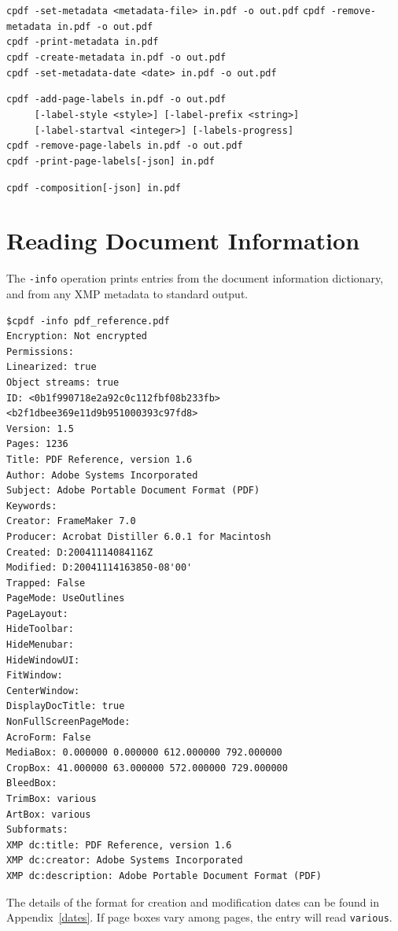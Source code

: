 \documentclass{book}
\begin{document}
\begin{framed}
    \vspace{1.5mm}
    \small\noindent\verb!cpdf -set-metadata <metadata-file> in.pdf -o out.pdf!
    \small\noindent\verb!cpdf -remove-metadata in.pdf -o out.pdf!\\
    \small\noindent\verb!cpdf -print-metadata in.pdf!\\
    \small\noindent\verb!cpdf -create-metadata in.pdf -o out.pdf!\\
    \small\noindent\verb!cpdf -set-metadata-date <date> in.pdf -o out.pdf!
    
    \vspace{1.5mm}
    \small\noindent\verb!cpdf -add-page-labels in.pdf -o out.pdf!\\
    \noindent\verb!     [-label-style <style>] [-label-prefix <string>]!\\
    \noindent\verb!     [-label-startval <integer>] [-labels-progress]!\\
    
    \vspace{1.5mm}
    \small\noindent\verb!cpdf -remove-page-labels in.pdf -o out.pdf!\\
    \small\noindent\verb!cpdf -print-page-labels[-json] in.pdf!

    \vspace{1.5mm}
    \small\noindent\verb!cpdf -composition[-json] in.pdf!
  \end{framed}
 
\section{Reading Document Information}
\label{info}
The \texttt{-info} operation prints entries from the document information
dictionary, and from any XMP metadata to standard output.

\begin{framed}
{\small\begin{verbatim}
$cpdf -info pdf_reference.pdf
Encryption: Not encrypted
Permissions: 
Linearized: true
Object streams: true
ID: <0b1f990718e2a92c0c112fbf08b233fb> <b2f1dbee369e11d9b951000393c97fd8>
Version: 1.5
Pages: 1236
Title: PDF Reference, version 1.6
Author: Adobe Systems Incorporated
Subject: Adobe Portable Document Format (PDF)
Keywords: 
Creator: FrameMaker 7.0
Producer: Acrobat Distiller 6.0.1 for Macintosh
Created: D:20041114084116Z
Modified: D:20041114163850-08'00'
Trapped: False
PageMode: UseOutlines
PageLayout: 
HideToolbar: 
HideMenubar: 
HideWindowUI: 
FitWindow: 
CenterWindow: 
DisplayDocTitle: true
NonFullScreenPageMode: 
AcroForm: False
MediaBox: 0.000000 0.000000 612.000000 792.000000
CropBox: 41.000000 63.000000 572.000000 729.000000
BleedBox: 
TrimBox: various
ArtBox: various
Subformats: 
XMP dc:title: PDF Reference, version 1.6
XMP dc:creator: Adobe Systems Incorporated
XMP dc:description: Adobe Portable Document Format (PDF)
\end{verbatim}}\end{framed}
\noindent The details of the format for creation and modification dates can be found in
Appendix~\ref{dates}. If page boxes vary among pages, the entry will read \texttt{various}.
\end{document}
